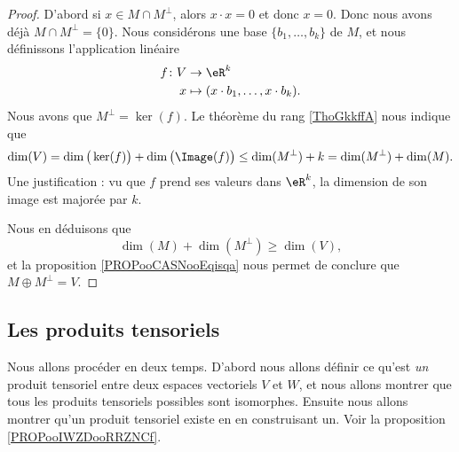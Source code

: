 \begin{proof}
    D'abord si \( x\in M\cap M^{\perp}\), alors \( x\cdot x=0\) et donc \( x=0\). Donc nous avons déjà \( M\cap M^{\perp}=\{ 0 \}\). Nous considérons une base \( \{b_1,\ldots, b_k\}\) de \( M\), et nous définissons l'application linéaire
    \begin{equation}
        \begin{aligned}
            f\colon V&\to \eR^k \\
            x&\mapsto (x\cdot b_1,\ldots, x\cdot b_k). 
        \end{aligned}
    \end{equation}
    Nous avons que \( M^{\perp}=\ker(f)\). Le théorème du rang \ref{ThoGkkffA} nous indique que
    \begin{equation}
        \dim(V)=\dim\big( \ker(f) \big)+\dim\big( \Image(f) \big)\leq \dim(M^{\perp})+k=\dim(M^{\perp})+\dim(M).
    \end{equation}
    Une justification : vu que \( f\) prend ses valeurs dans \( \eR^k\), la dimension de son image est majorée par \( k\).

    Nous en déduisons que 
    \begin{equation}
        \dim(M)+\dim(M^{\perp})\geq\dim(V),
    \end{equation}
    et la proposition \ref{PROPooCASNooEqisqa} nous permet de conclure que \( M\oplus M^{\perp}=V\).
\end{proof}

\subsection{Les produits tensoriels}

Nous allons procéder en deux temps. D'abord nous allons définir ce qu'est \emph{un} produit tensoriel entre deux espaces vectoriels \( V\) et \( W\), et nous allons montrer que tous les produits tensoriels possibles sont isomorphes. Ensuite nous allons montrer qu'un produit tensoriel existe en en construisant un. Voir la proposition \ref{PROPooIWZDooRRZNCf}.

